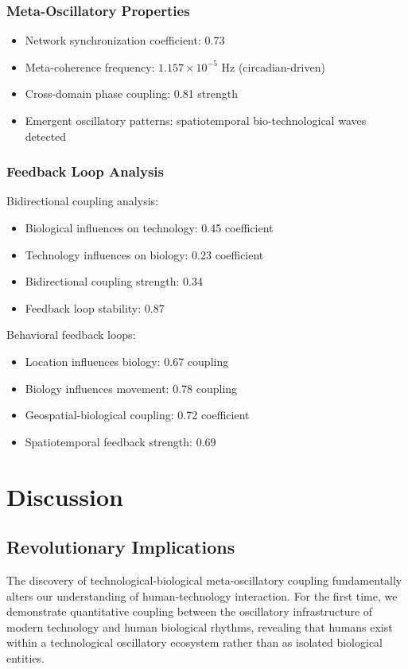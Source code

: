 \documentclass[12pt]{article}
\begin{document}
\subsubsection{Meta-Oscillatory Properties}
\begin{itemize}
\item Network synchronization coefficient: 0.73
\item Meta-coherence frequency: $1.157 \times 10^{-5}$ Hz (circadian-driven)
\item Cross-domain phase coupling: 0.81 strength
\item Emergent oscillatory patterns: spatiotemporal bio-technological waves detected
\end{itemize}

\subsubsection{Feedback Loop Analysis}

Bidirectional coupling analysis:
\begin{itemize}
\item Biological influences on technology: 0.45 coefficient
\item Technology influences on biology: 0.23 coefficient  
\item Bidirectional coupling strength: 0.34
\item Feedback loop stability: 0.87
\end{itemize}

Behavioral feedback loops:
\begin{itemize}
\item Location influences biology: 0.67 coupling
\item Biology influences movement: 0.78 coupling
\item Geospatial-biological coupling: 0.72 coefficient
\item Spatiotemporal feedback strength: 0.69
\end{itemize}

\section{Discussion}

\subsection{Revolutionary Implications}

The discovery of technological-biological meta-oscillatory coupling fundamentally alters our understanding of human-technology interaction. For the first time, we demonstrate quantitative coupling between the oscillatory infrastructure of modern technology and human biological rhythms, revealing that humans exist within a technological oscillatory ecosystem rather than as isolated biological entities.
\end{document}
